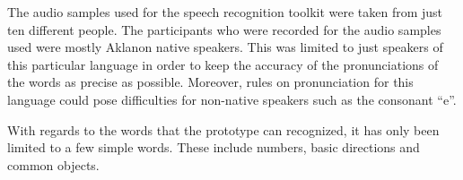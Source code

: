 The audio samples used for the speech recognition toolkit were taken from just ten different people. The participants who were recorded for the audio samples used were mostly Aklanon native speakers. This was limited to just speakers of this particular language in order to keep the accuracy of the pronunciations of the words as precise as possible. Moreover, rules on pronunciation for this language could pose difficulties for non-native speakers such as the consonant “e”. 

With regards to the words that the prototype can recognized, it has only been limited to a few simple words. These include numbers, basic directions and common objects. 


